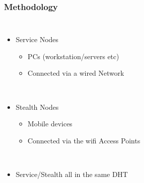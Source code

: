\documentclass{beamer}
\begin{document}
\begin{frame}
  \frametitle{Methodology}
  \begin{columns}

    \column{6cm}

    \column{5cm}
    \begin{itemize}
      \item Service Nodes
      \begin{itemize}
        \item PCs (workstation/servers etc)
        \item Connected via a wired Network
      \end{itemize}
      ~\\
      \item Stealth Nodes
      \begin{itemize}
        \item Mobile devices
        \item Connected via the wifi Access Points
      \end{itemize}
      ~\\
      \item Service/Stealth all in the same DHT
    \end{itemize}
  \end{columns}
\end{frame}

%
%

\end{document}
